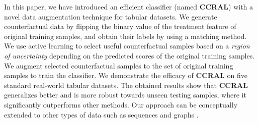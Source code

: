 In this paper, we have introduced an efficient classifier (named \textbf{CCRAL})
with a novel data augmentation technique for tabular datasets. We
generate counterfactual data by flipping the binary value of the treatment
feature of original training samples, and obtain their labels by using
a matching method. We use active learning to select useful counterfactual
samples based on a \textit{region of uncertainty} depending on the
predicted scores of the original training samples. We augment selected
counterfactual samples to the set of original training samples to
train the classifier. We demonstrate the efficacy of \textbf{CCRAL}
on five standard real-world tabular datasets. The obtained results
show that \textbf{CCRAL} generalizes better and is more robust towards
unseen testing samples, where it significantly outperforms other methods.
Our approach can be conceptually extended to other types of data such
as sequences \cite{nguyen2018sqn2vec} and graphs \cite{nguyen2018learning}.
